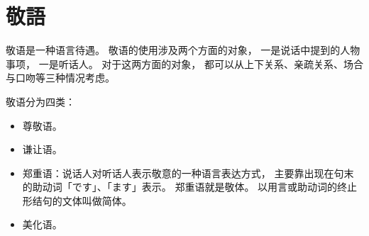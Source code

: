 \section{敬語}%

敬语是一种语言待遇。
敬语的使用涉及两个方面的对象，
一是说话中提到的人物事项，
一是听话人。
对于这两方面的对象，
都可以从上下关系、亲疏关系、场合与口吻等三种情况考虑。

敬语分为四类：
\begin{itemize}
  \item 尊敬语。
  \item 谦让语。
  \item 郑重语：说话人对听话人表示敬意的一种语言表达方式，
    主要靠出现在句末的助动词「です」、「ます」表示。
    郑重语就是敬体。
    以用言或助动词的终止形结句的文体叫做简体。
  \item 美化语。
\end{itemize}



